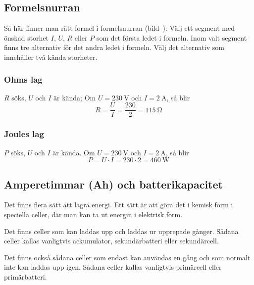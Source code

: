 \pagebreak[3]

\subsection{Formelsnurran}


Så här finner man rätt formel i formelsnurran (bild~):
Välj ett segment med önskad storhet \(I\), \(U\), \(R\) eller \(P\) som det
första ledet i formeln.
Inom valt segment finns tre alternativ för det andra ledet i formeln.
Välj det alternativ som innehåller två kända storheter.


\subsubsection{Ohms lag}

\(R\) söks, \(U\) och \(I\) är kända;
Om \(U = \qty{230}{\volt}\) och \(I = \qty{2}{\ampere}\), så blir
\[R=\dfrac{U}{I}=\dfrac{230}{2}=\qty{115}{\ohm}\]
\subsubsection{Joules lag}

\(P\) söks, \(U\) och \(I\) är kända.
Om \(U = \qty{230}{\volt}\) och \(I = \qty{2}{\ampere}\), så blir
\[P = U \cdot I = 230 \cdot 2 = \qty{460}{\watt}\]
\subsection{Amperetimmar (Ah) och batterikapacitet}
\label{batterikapacitet}

Det finns flera sätt att lagra energi.
Ett sätt är att göra det i kemisk form i speciella celler, där man kan ta ut
energin i elektrisk form.

Det finns celler som kan laddas upp och laddas ur upprepade gånger.
Sådana celler kallas vanligtvis ackumulator, sekundärbatteri eller
sekundärcell.

\newpage
Det finns också sådana celler som endast kan användas en gång och som normalt
inte kan laddas upp igen.
Sådana celler kallas vanligtvis primärcell eller primärbatteri.


